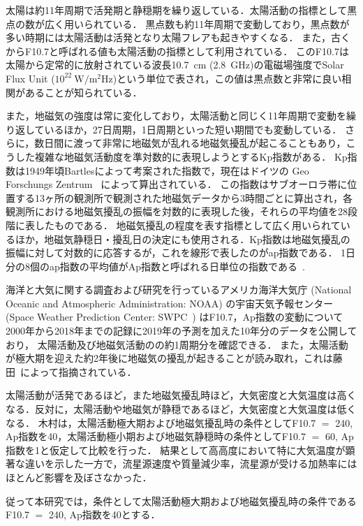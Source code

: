 太陽は約11年周期で活発期と静穏期を繰り返している．太陽活動の指標として黒点の数が広く用いられている．
黒点数も約11年周期で変動しており，黒点数が多い時期には太陽活動は活発となり太陽フレアも起きやすくなる．
また，古くからF10.7と呼ばれる値も太陽活動の指標として利用されている．
このF10.7は太陽から定常的に放射されている波長10.7~cm (2.8~GHz)の電磁場強度でSolar Flux Unit ($10^{22}~\mathrm{W/m^2Hz}$)という単位で表され，この値は黒点数と非常に良い相関があることが知られている．

また，地磁気の強度は常に変化しており，太陽活動と同じく11年周期で変動を繰り返しているほか，27日周期，1日周期といった短い期間でも変動している．
さらに，数日間に渡って非常に地磁気が乱れる地磁気擾乱が起こることもあり，こうした複雑な地磁気活動度を準対数的に表現しようとするKp指数がある．
Kp指数は1949年頃Bartlesによって考案された指数で，現在はドイツの Geo Forschungs Zentrum~\cite{GeoForschungsZentrum} によって算出されている．
この指数はサブオーロラ帯に位置する13ヶ所の観測所で観測された地磁気データから3時間ごとに算出され，各観測所における地磁気擾乱の振幅を対数的に表現した後，それらの平均値を28段階に表したものである．
地磁気擾乱の程度を表す指標として広く用いられているほか，地磁気静穏日・擾乱日の決定にも使用される．Kp指数は地磁気擾乱の振幅に対して対数的に応答するが，これを線形で表したのがap指数である．
1日分の8個のap指数の平均値がAp指数と呼ばれる日単位の指数である~\cite{GeoForschungsZentrum}.

海洋と大気に関する調査および研究を行っているアメリカ海洋大気庁 (National Oceanic and Atmospheric Administration: NOAA) の宇宙天気予報センター (Space Weather Prediction Center: SWPC~\cite{SWPC-NOAA}) はF10.7，Ap指数の変動について2000年から2018年までの記録に2019年の予測を加えた10年分のデータを公開しており，
太陽活動及び地磁気活動のの約1周期分を確認できる．
また，太陽活動が極大期を迎えた約2年後に地磁気の擾乱が起きることが読み取れ，これは藤田~\cite{fujita2007taiyou}によって指摘されている．

太陽活動が活発であるほど，また地磁気擾乱時ほど，大気密度と大気温度は高くなる．反対に，太陽活動や地磁気が静穏であるほど，大気密度と大気温度は低くなる．
木村\cite{kimura2018master}は，太陽活動極大期および地磁気擾乱時の条件としてF10.7 $=$ 240, Ap指数を40，太陽活動極小期および地磁気静穏時の条件としてF10.7 $=$ 60, Ap指数を1と仮定して比較を行った．
結果として高高度において特に大気温度が顕著な違いを示した一方で，流星源速度や質量減少率，流星源が受ける加熱率にはほとんど影響を及ぼさなかった．

従って本研究では，条件として太陽活動極大期および地磁気擾乱時の条件であるF10.7 $=$ 240, Ap指数を40とする．

